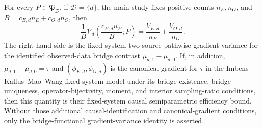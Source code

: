 For every \(P\in\mathfrak P_{\mathcal D}\), if \(\mathcal D=\{d\}\), the main study fixes positive counts \(n_E,n_O\), and \(B=c_{E,d}n_E+c_{O,d}n_O\), then
\[
 \frac{1}{B}\mathcal V_d\!\left(\frac{c_{E,d}n_E}{B};P\right)
 =\frac{V_{E,d}}{n_E}+\frac{V_{O,d}}{n_O}.
\]
The right-hand side is the fixed-system two-source pathwise-gradient variance for the identified observed-data bridge contrast \(\mu_{d,1}-\mu_{d,0}\). If, in addition, \(\mu_{d,1}-\mu_{d,0}=\tau\) and \((\phi_{E,d},\phi_{O,d})\) is the canonical gradient for \(\tau\) in the Imbens--Kallus--Mao--Wang fixed-system model under its bridge-existence, bridge-uniqueness, operator-bijectivity, moment, and interior sampling-ratio conditions, then this quantity is their fixed-system causal semiparametric efficiency bound. Without those additional causal-identification and canonical-gradient conditions, only the bridge-functional gradient-variance identity is asserted.